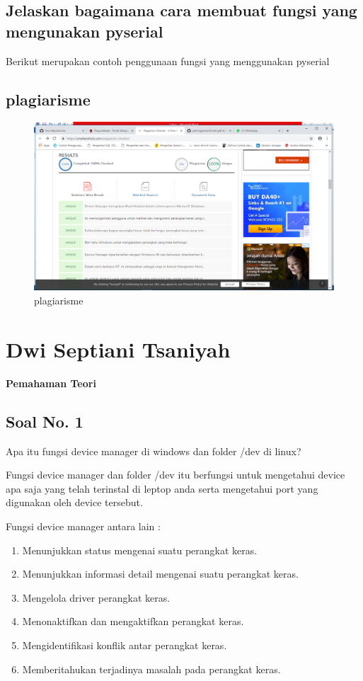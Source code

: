 \subsection{Jelaskan bagaimana cara membuat fungsi yang mengunakan pyserial}
Berikut merupakan contoh penggunaan fungsi yang menggunakan pyserial


\subsection{plagiarisme}
\begin{figure}[h]
\centering
\includegraphics[scale=0.2]{figures/5/1174012/SS2.png}
\caption{plagiarisme}
\label{fig:plagiat}
\end{figure}


\section{Dwi Septiani Tsaniyah}
{\Large \textbf{Pemahaman Teori}}
\subsection{Soal No. 1}

Apa itu fungsi device manager di windows dan folder /dev di linux?

\hfill \break
Fungsi device manager dan folder /dev itu berfungsi untuk mengetahui device apa saja yang telah terinstal di leptop anda serta mengetahui port yang digunakan oleh device tersebut.

\hfill \break
Fungsi device manager antara lain :
\begin{enumerate}
	\item Menunjukkan status mengenai suatu perangkat keras.
	\item Menunjukkan informasi detail mengenai suatu perangkat keras.
	\item Mengelola driver perangkat keras.
	\item Menonaktifkan dan mengaktifkan perangkat keras.
	\item Mengidentifikasi konflik antar perangkat keras.
	\item Memberitahukan terjadinya masalah pada perangkat keras.
\end{enumerate}

